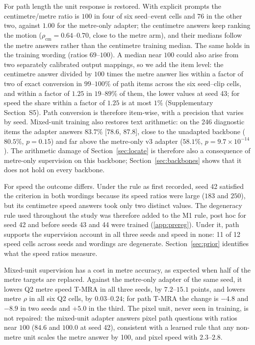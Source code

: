 \documentclass[preprint,number]{elsarticle}
\newcommand{\supp}[1]{Supplementary Section~S#1}
\begin{document}


For path length the unit response is restored. With explicit prompts the
centimetre/metre ratio is $100$ in four of six seed--event cells and $76$ in the
other two, against $1.00$ for the metre-only adapter; the centimetre answers
keep ranking the motion ($\rho_{\mathrm{cm}}=0.64$--$0.70$, close to the metre
arm), and their medians follow the metre answers rather than the centimetre
training median. The same holds in the training wording (ratios $69$--$100$).
A median near $100$ could also arise from two separately calibrated output
mappings, so we add the item level: the centimetre answer divided by $100$
times the metre answer lies within a factor of two of exact conversion in
$99$--$100\%$ of path items across the six seed--clip cells, and within a
factor of $1.25$ in $19$--$89\%$ of them, the lower values at seed 43; for
speed the share within a factor of $1.25$ is at most $1\%$ (\supp{5}). Path
conversion is therefore
item-wise, with a precision that varies by seed.
Mixed-unit training also restores text arithmetic: on the 246 diagnostic items
the adapter answers $83.7\%$ [$78.6$, $87.8$], close to the
unadapted backbone ($80.5\%$, $p=0.15$) and far above the metre-only v3 adapter
($58.1\%$, $p=9.7\times10^{-14}$). The arithmetic damage of
Section~\ref{sec:locate} is therefore also a consequence of metre-only
supervision on this backbone; Section~\ref{sec:backbones} shows that it does
not hold on every backbone.

For speed the outcome differs. Under the rule as first recorded, seed 42
satisfied the criterion in both wordings because its speed ratios were large
($183$ and $250$), but its centimetre speed answers took only two distinct
values. The degeneracy rule used throughout the study was therefore added to
the M1 rule, post hoc for seed 42 and before seeds 43 and 44 were trained
(\ref{app:prereg}). Under it, path supports the supervision account in all
three seeds and speed in none: 11 of 12 speed cells across seeds and wordings
are degenerate. Section~\ref{sec:prior} identifies what the speed ratios
measure.

Mixed-unit supervision has a cost in metre accuracy, as expected when half of
the metre targets are replaced. Against the metre-only adapter of the same
seed, it lowers Q2 metre speed T-MRA in all three seeds, by $7.2$--$15.1$
points, and lowers metre $\rho$ in all six Q2 cells, by $0.03$--$0.24$; for
path T-MRA the change is $-4.8$ and $-8.9$ in two seeds and $+5.0$ in the
third. The pixel unit, never seen in training, is not repaired: the mixed-unit
adapter answers pixel path questions with ratios near $100$ ($84.6$ and
$100.0$ at seed 42), consistent with a learned rule that any non-metre unit
scales the metre answer by 100, and pixel speed with $2.3$--$2.8$.
\end{document}
